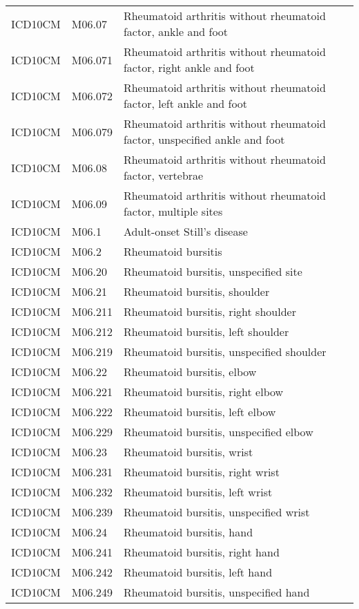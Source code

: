\begin{longtable}{p{}p{}p{}}
  ICD10CM & M06.07 & Rheumatoid arthritis without rheumatoid factor, ankle and foot \\ 
  ICD10CM & M06.071 & Rheumatoid arthritis without rheumatoid factor, right ankle and foot \\ 
  ICD10CM & M06.072 & Rheumatoid arthritis without rheumatoid factor, left ankle and foot \\ 
  ICD10CM & M06.079 & Rheumatoid arthritis without rheumatoid factor, unspecified ankle and foot \\ 
  ICD10CM & M06.08 & Rheumatoid arthritis without rheumatoid factor, vertebrae \\ 
  ICD10CM & M06.09 & Rheumatoid arthritis without rheumatoid factor, multiple sites \\ 
  ICD10CM & M06.1 & Adult-onset Still's disease \\ 
  ICD10CM & M06.2 & Rheumatoid bursitis \\ 
  ICD10CM & M06.20 & Rheumatoid bursitis, unspecified site \\ 
  ICD10CM & M06.21 & Rheumatoid bursitis, shoulder \\ 
  ICD10CM & M06.211 & Rheumatoid bursitis, right shoulder \\ 
  ICD10CM & M06.212 & Rheumatoid bursitis, left shoulder \\ 
  ICD10CM & M06.219 & Rheumatoid bursitis, unspecified shoulder \\ 
  ICD10CM & M06.22 & Rheumatoid bursitis, elbow \\ 
  ICD10CM & M06.221 & Rheumatoid bursitis, right elbow \\ 
  ICD10CM & M06.222 & Rheumatoid bursitis, left elbow \\ 
  ICD10CM & M06.229 & Rheumatoid bursitis, unspecified elbow \\ 
  ICD10CM & M06.23 & Rheumatoid bursitis, wrist \\ 
  ICD10CM & M06.231 & Rheumatoid bursitis, right wrist \\ 
  ICD10CM & M06.232 & Rheumatoid bursitis, left wrist \\ 
  ICD10CM & M06.239 & Rheumatoid bursitis, unspecified wrist \\ 
  ICD10CM & M06.24 & Rheumatoid bursitis, hand \\ 
  ICD10CM & M06.241 & Rheumatoid bursitis, right hand \\ 
  ICD10CM & M06.242 & Rheumatoid bursitis, left hand \\ 
  ICD10CM & M06.249 & Rheumatoid bursitis, unspecified hand \\ 

\end{longtable}
